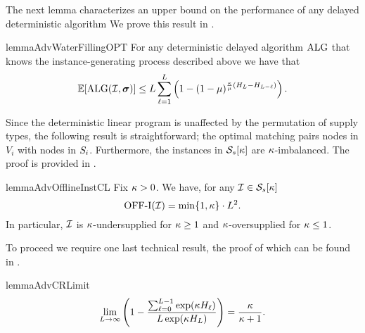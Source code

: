 
The next lemma characterizes an upper bound on the performance of any delayed deterministic algorithm %
We prove this result in .
\begin{restatable}{lemma}{AdvWaterFillingOPT} 
\label{claim: AdvWaterFillingOPT} 
For any deterministic delayed algorithm $\mathrm{ALG}$ that knows the instance-generating process described above we have that 
    \begin{equation*}
     \mathbb E[\mathrm{ALG}(\mathcal I, \bm{\sigma})] \leq 
    L \sum_{\ell=1}^L \left( 1 - (1-\mu)^{\frac{\kappa}{\mu} (H_L - H_{L-\ell})} \right).
    \end{equation*}
\end{restatable}
Since the deterministic linear program is unaffected by the permutation of supply types, the following result is straightforward; the optimal matching pairs nodes in $V_i$ with nodes in $S_i$. Furthermore, the instances in $\mathcal S_s[\kappa]$ are $\kappa$-imbalanced. The proof is provided in .

\begin{restatable}{lemma}{AdvOfflineInstCL}
    \label{claim: AdvOfflineInstCL} 
     Fix $\kappa > 0$. We have, for any $\mathcal I \in \mathcal{S}_s[\kappa]$
     \begin{equation*}
        \mathrm{\mathrm{OFF}}\textrm{-}\mathrm{I}(\mathcal I) = \min \{1, \kappa \} \cdot L^2. 
    \end{equation*}
    In particular, $\mathcal I$ is $\kappa$-undersupplied for $\kappa \geq 1$ and $\kappa$-oversupplied for $\kappa \leq 1$.
\end{restatable}
To proceed we require one last technical result, the proof of which can be found in .

\begin{restatable}{lemma}{AdvCRLimit}
    \label{claim: AdvCRLimit}
    \begin{equation*}
        \lim_{L \rightarrow \infty} \left( 1-\frac{\sum_{\ell=0}^{L-1} \exp(\kappa H_{\ell})}{L \exp(\kappa H_L)} \right)= \frac{\kappa}{\kappa + 1}.
    \end{equation*}
\end{restatable}

